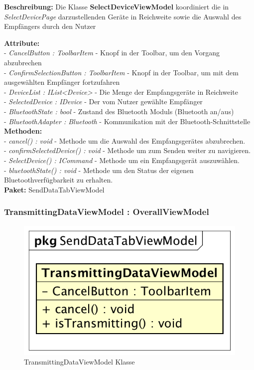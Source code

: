 \documentclass[a4paper]{scrreprt}
\begin{document}
\textbf{Beschreibung:} Die Klasse \textbf{SelectDeviceViewModel} koordiniert die in \textit{SelectDevicePage} darzustellenden Geräte in Reichweite sowie die Auswahl des Empfängers durch den Nutzer

\textbf{Attribute:}\\
- \textit{CancelButton : ToolbarItem} - Knopf in der Toolbar, um den Vorgang abzubrechen\\
- \textit{ConfirmSelectionButton : ToolbarItem} - Knopf in der Toolbar, um mit dem ausgewählten Empfänger fortzufahren\\
- \textit{DeviceList : IList<Device>} - Die Menge der Empfangsgeräte in Reichweite\\
- \textit{SelectedDevice : IDevice} - Der vom Nutzer gewählte Empfänger\\
- \textit{BluetoothState : bool} - Zustand des Bluetooth Moduls (Bluetooth an/aus)\\
- \textit{BluetoothAdapter : Bluetooth} - Kommunikation mit der Bluetooth-Schnittstelle\\

\textbf{Methoden:}\\
- \textit{cancel() : void} - Methode um die Auswahl des Empfangsgerätes abzubrechen.\\
- \textit{confirmSelectedDevice() : void} - Methode um zum Senden weiter zu navigieren.\\
- \textit{SelectDevice() : ICommand} - Methode um ein Empfangsgerät auszuwählen.\\
- \textit{bluetoothState() : void} - Methode um den Status der eigenen Bluetoothverfügbarkeit zu erhalten.\\


\textbf{Paket:} SendDataTabViewModel

\subsubsection{TransmittingDataViewModel : OverallViewModel}
\begin{figure}[H]
\centering
\includegraphics[width=0.45\textheight]{graphics/Klassendiagramme/ViewModel/TransmittingDataViewModel.png}
\caption{TransmittingDataViewModel Klasse}
\end{figure}
\end{document}
